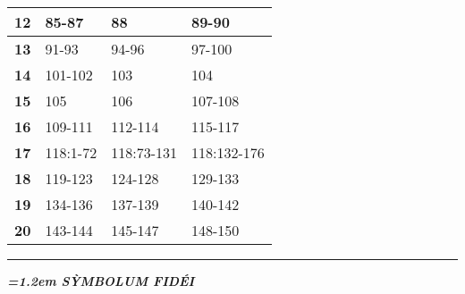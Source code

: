 \documentclass[twoside,10pt]{article}
\begin{document}
{{\begin{table}[ht]
\begin{tabular}{|cccc|}
    \multicolumn{1}{|c|}{\textbf{12}} & \multicolumn{1}{l|}{85-87} & \multicolumn{1}{l|}{88} & \multicolumn{1}{l|}{89-90} \\ \hline
    \multicolumn{1}{|c|}{\textbf{13}} & \multicolumn{1}{l|}{91-93} & \multicolumn{1}{l|}{94-96} & \multicolumn{1}{l|}{97-100} \\ \hline
    \multicolumn{1}{|c|}{\textbf{14}} & \multicolumn{1}{l|}{101-102} & \multicolumn{1}{l|}{103} & \multicolumn{1}{l|}{104} \\ \hline
    \multicolumn{1}{|c|}{\textbf{15}} & \multicolumn{1}{l|}{105} & \multicolumn{1}{l|}{106} & \multicolumn{1}{l|}{107-108} \\ \hline
    \multicolumn{1}{|c|}{\textbf{16}} & \multicolumn{1}{l|}{109-111} & \multicolumn{1}{l|}{112-114} & \multicolumn{1}{l|}{115-117} \\ \hline
    \multicolumn{1}{|c|}{\textbf{17}} & \multicolumn{1}{l|}{118:1-72} & \multicolumn{1}{l|}{118:73-131} & \multicolumn{1}{l|}{118:132-176} \\ \hline
    \multicolumn{1}{|c|}{\textbf{18}} & \multicolumn{1}{l|}{119-123} & \multicolumn{1}{l|}{124-128} & \multicolumn{1}{l|}{129-133} \\ \hline
    \multicolumn{1}{|c|}{\textbf{19}} & \multicolumn{1}{l|}{134-136} & \multicolumn{1}{l|}{137-139} & \multicolumn{1}{l|}{140-142} \\ \hline
    \multicolumn{1}{|c|}{\textbf{20}} & \multicolumn{1}{l|}{143-144} & \multicolumn{1}{l|}{145-147} & \multicolumn{1}{l|}{148-150} \\ \hline
    \end{tabular}
    \end{table}
  }
}

\newpage

\vspace*{0.60em}

{
  \begin{center}
  \rule{5em}{0.4pt}
  \end{center}
}

{
  \medskip
  \begin{center}
  {\bfseries\itshape\large{}\font=1.2em \uppercase{sỳmbolum fidéi}}
  \end{center}
  \medskip
}
\end{document}
